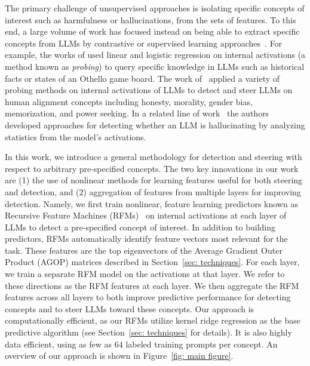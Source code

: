 The primary challenge of  unsupervised approaches is isolating specific concepts of interest such as harmfulness or hallucinations, from the sets of features.  To this end, a large volume of work has focused instead on being able to extract specific concepts from LLMs by contrastive or supervised learning approaches~\citep{othello_probe, azaria2023internal, turner2023activation, burns2022discovering, li2024inference, panickssery2023steering, belinkov2022probing, stolfo2024improving}.  For example, the works of \citep{gottesman2024estimating, othello_probe} used linear and logistic regression on internal activations (a method known as \textit{probing}) to query specific knowledge in LLMs such as historical facts or states of an Othello game board.  The work of~\cite{representation_engineering} applied a variety of probing methods on internal activations of LLMs to detect and steer LLMs on human alignment concepts including honesty, morality, gender bias, memorization, and power seeking. In a related line of work~\cite{LLMcheck} the authors developed approaches for detecting whether an LLM is hallucinating by analyzing statistics from the model's activations.

In this work, we introduce a general methodology for detection and steering with respect to arbitrary pre-specified concepts.  The two key innovations in our work are (1) the use of nonlinear methods for learning features useful for both steering and detection, and (2) aggregation of features from multiple layers for improving detection. Namely, we first train nonlinear, feature learning predictors known as Recursive Feature Machines (RFMs)~\cite{rfm_science} on internal activations at each layer of LLMs to detect a pre-specified concept of interest.  In addition to building predictors, RFMs automatically identify feature vectors most relevant for the task. These features are the top eigenvectors of the Average Gradient Outer Product (AGOP) matrices described in Section~\ref{sec: techniques}. For each layer, we train a separate RFM model on the activations at that layer. We refer to these directions as the RFM features at each layer. We then aggregate the RFM features across all layers to both improve predictive performance for detecting concepts and to steer LLMs toward these concepts. Our approach is computationally efficient, as our RFMs utilize kernel ridge regression as the base predictive algorithm (see Section~\ref{sec: techniques} for details). It is also highly data efficient, using as few as $64$ labeled training prompts per concept.  An overview of our approach is shown in Figure~\ref{fig: main figure}.   


